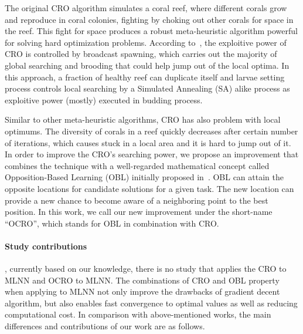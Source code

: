 \documentclass[review,3p,authoryear]{elsarticle}
\begin{document}
The original CRO algorithm simulates a coral reef, where different corals grow and reproduce in coral colonies, fighting by choking out other corals for space in the reef. This fight for space produces a robust meta-heuristic algorithm powerful for solving hard optimization problems. According to~\citep{ref_salcedo_sanz5}, the exploitive power of CRO is controlled by broadcast spawning, which carries out the majority of global searching and brooding that could help jump out of the local optima. In this approach, a fraction of healthy reef can duplicate itself and larvae setting process controls local searching by a Simulated Annealing (SA) alike process as exploitive power (mostly) executed in budding process. 

Similar to other meta-heuristic algorithms, CRO has also problem with local optimums. The diversity of corals in a reef quickly decreases after certain number of iterations, which causes stuck in a local area and it is hard to jump out of it. In order to improve the CRO's searching power, we propose an improvement that combines the technique with a well-regarded mathematical concept called Opposition-Based Learning (OBL) initially proposed in~\citep{ref_Tizhoosh}. OBL can attain the opposite locations for candidate solutions for a given task. The new location can provide a new chance to become aware of a neighboring point to the best position. In this work, we call our new improvement under the short-name ``OCRO'', which stands for OBL in combination with CRO. 

\paragraph{Study contributions}, currently based on our knowledge, there is no study that applies the CRO to MLNN and OCRO to MLNN. The combinations of CRO and OBL property when applying to MLNN not only improve the drawbacks of gradient decent algorithm, but also enables fast convergence to optimal values as well as reducing computational cost. In comparison with above-mentioned works, the main differences and contributions of our work are as follows.
\end{document}
